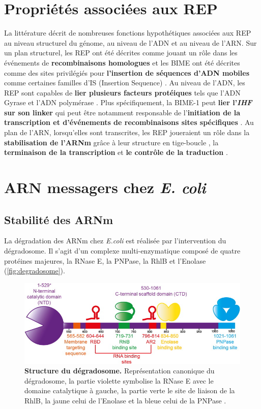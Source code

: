 \documentclass[12pt,a4paper]{report}
\begin{document}
\begin{onehalfspace}
\section*{Propriétés associées aux REP}
La littérature décrit de nombreuses fonctions hypothétiques associées aux REP au niveau structurel du génome, au niveau de l'ADN et au niveau de l'ARN. Sur un plan structurel, les REP ont été décrites comme jouant un rôle dans les événements de \textbf{recombinaisons homologues} \citep{Kofoid2003} et les BIME ont été décrites comme des sites privilégiés pour \textbf{l'insertion de séquences d'ADN mobiles} comme certaines familles d'IS (Insertion Sequence) \citep{Bachellier1997,Clement1999,Choi2003,Tobes2005}. Au niveau de l'ADN, les REP sont capables de \textbf{lier plusieurs facteurs protéiques} tels que l'ADN Gyrase \citep{Espeli1997} et l'ADN polymérase \citep{Gilson1990}. Plus spécifiquement, la BIME-1 peut \textbf{lier l'\textit{IHF} sur son linker} \citep{Boccard1993} qui peut être notamment responsable de l'\textbf{initiation de la transcription et d’événements de recombinaisons sites spécifiques} \citep{Goosen1995}. Au plan de l'ARN, lorsqu'elles sont transcrites, les REP joueraient un rôle dans la \textbf{stabilisation de l'ARNm} grâce à leur structure en tige-boucle \citep{Newbury1987,Espeli2001,Khemici2004,Aguena2009}, la \textbf{terminaison de la transcription} \citep{Gilson1986} et \textbf{le contrôle de la traduction} \citep{Stern1988}. 

\section*{ARN messagers chez \textit{E. coli}}

\subsection*{Stabilité des ARNm}
La dégradation des ARNm chez \textit{E.coli} est réalisée par l'intervention du dégradosome. Il s'agit d'un complexe multi-enzymatique composé de quatre protéines majeures, la RNase E, la PNPase, la RhlB et l'Enolase (\autoref{fig:degradosome}).

\begin{figure}[ht]
\centerline{\includegraphics[scale=4]{figures/degradosome.jpg}}
\caption{\textbf{Structure du dégradosome.} Représentation canonique du dégradosome, la partie violette symbolise la RNase E avec le domaine catalytique à gauche, la partie verte le site de liaison de la RhlB, la jaune celui de l'Enolase et la bleue celui de la PNPase \citep{Bandyra2013}.}
\label{fig:degradosome} 
\end{figure}


\end{onehalfspace}
\end{document}
